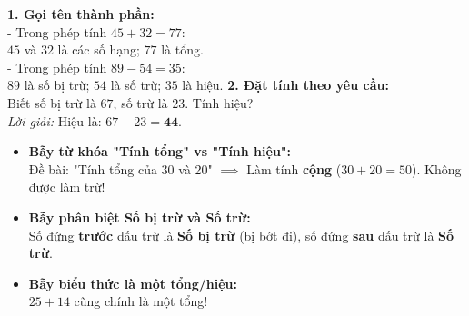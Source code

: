 \documentclass[11pt,a4paper]{article}
\begin{document}
\vspace{-1.5mm}
\noindent
\begin{minipage}[t]{0.49\textwidth}\vspace{0pt}
\begin{tcolorbox}[
  enhanced,
  colback=green!4!white,
  colframe=green!60!black,
  arc=2mm, boxrule=0.8pt,
  left=2mm, right=2mm, top=1.8mm, bottom=1.8mm,
  title={\footnotesize\bfseries\color{white}\faCheckCircle\ 4. Ví dụ thực hành chuẩn mực}
]
{\footnotesize
\textbf{1. Gọi tên thành phần:}\\
- Trong phép tính $45 + 32 = 77$:\\
  $45$ và $32$ là các số hạng; $77$ là tổng.\\
- Trong phép tính $89 - 54 = 35$:\\
  $89$ là số bị trừ; $54$ là số trừ; $35$ là hiệu.
\textbf{2. Đặt tính theo yêu cầu:}\\
Biết số bị trừ là $67$, số trừ là $23$. Tính hiệu?\\
\textit{Lời giải:} Hiệu là: $67 - 23 = \mathbf{44}$.
}
\end{tcolorbox}
\end{minipage}
\hfill
\begin{minipage}[t]{0.49\textwidth}\vspace{0pt}
\begin{tcolorbox}[
  enhanced,
  colback=red!4!white,
  colframe=red!75!black,
  arc=2mm, boxrule=0.8pt,
  left=2mm, right=2mm, top=1.8mm, bottom=1.8mm,
  title={\footnotesize\bfseries\color{white}\faExclamationTriangle\ 5. Mẹo tránh bẫy trắc nghiệm}
]
{\footnotesize
\begin{itemize}\setlength{\itemsep}{1pt}\setlength{\leftskip}{-2.5mm}
  \item \textbf{Bẫy từ khóa "Tính tổng" vs "Tính hiệu":}\\
  Đề bài: "Tính tổng của 30 và 20" $\implies$ Làm tính \textbf{cộng} ($30 + 20 = 50$). Không được làm trừ!
  \item \textbf{Bẫy phân biệt Số bị trừ và Số trừ:}\\
  Số đứng \textbf{trước} dấu trừ là \textbf{Số bị trừ} (bị bớt đi), số đứng \textbf{sau} dấu trừ là \textbf{Số trừ}.
  \item \textbf{Bẫy biểu thức là một tổng/hiệu:}\\
  $25 + 14$ cũng chính là một tổng!
\end{itemize}
}
\end{tcolorbox}
\end{minipage}
\end{document}
